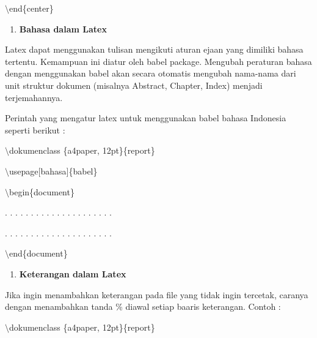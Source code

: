 \hspace{0,5in}$\setminus$end\{center\}

\begin{enumerate}
\setcounter{enumi}{\thenumberedCntB}
\item \textbf{Bahasa dalam Latex}
\setcounter{numberedCntB}{\theenumi}
\end{enumerate}
\hspace{0,5in}Latex dapat menggunakan tulisan mengikuti aturan ejaan yang dimiliki bahasa tertentu. Kemampuan ini diatur oleh babel package. Mengubah peraturan bahasa dengan menggunakan babel akan secara otomatis mengubah nama-nama dari unit struktur dokumen (misalnya Abstract, Chapter, Index) 
menjadi terjemahannya.\par \vspace{12pt}

Perintah yang mengatur latex untuk menggunakan babel bahasa Indonesia seperti berikut :

$\setminus$dokumenclass \{a4paper, 12pt\}\{report\}\par \vspace{12pt}

$\setminus$usepage$[$bahasa$]$\{babel\}\par \vspace{12pt}

$\setminus$begin\{document\}\par \vspace{12pt}

. . . . . . . . . . . . . . . . . . . . .

. . . . . . . . . . . . . . . . . . . . .
\par \vspace{12pt}
$\setminus$end\{document\}

\begin{enumerate}
\setcounter{enumi}{\thenumberedCntB}
\item \textbf{Keterangan dalam Latex}
\setcounter{numberedCntB}{\theenumi}
\end{enumerate}
\hspace{0,5in}Jika ingin menambahkan keterangan pada file yang tidak ingin tercetak, caranya dengan menambahkan tanda \% diawal setiap baaris keterangan. Contoh :\par \vspace{12pt}

$\setminus$dokumenclass \{a4paper, 12pt\}\{report\}\par \vspace{12pt}

